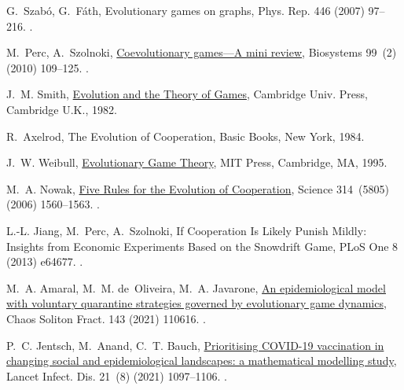 \documentclass[5p,review]{elsarticle}
\begin{document}
\begin{thebibliography}{10}
G.~Szab{\'{o}}, G.~F{\'{a}}th, {Evolutionary games on graphs}, Phys. Rep. 446
  (2007) 97--216.
\newblock \href {http://dx.doi.org/10.1016/j.physrep.2007.04.004}
  {}.

M.~Perc, A.~Szolnoki,
  \href{http://www.sciencedirect.com/science/article/pii/S0303264709001646}{{Coevolutionary
  games—A mini review}}, Biosystems 99~(2) (2010) 109--125.
\newblock \href {http://dx.doi.org/10.1016/j.biosystems.2009.10.003}
  {}.

J.~M. Smith,
  \href{https://books.google.com.br/books?id=Nag2IhmPS3gC{\&}printsec=frontcover{\&}dq=isbn:9780521288842{\&}hl=pt-BR{\&}sa=X{\&}ved=0ahUKEwjw6eHkvePRAhVEiZAKHYOfAcYQ6AEIHDAA{\#}v=onepage{\&}q{\&}f=false}{{Evolution and the Theory of Games}}, Cambridge Univ. Press, Cambridge U.K., 1982.


R.~Axelrod, The Evolution of Cooperation, Basic Books, New York, 1984.

J.~W. Weibull,
  \href{https://mitpress.mit.edu/books/evolutionary-game-theory}{{Evolutionary
  Game Theory}}, MIT Press, Cambridge, MA, 1995.

M.~A. Nowak,
  \href{http://www.sciencemag.org/cgi/doi/10.1126/science.1133755}{{Five Rules
  for the Evolution of Cooperation}}, Science 314~(5805) (2006) 1560--1563.
\newblock \href {http://dx.doi.org/10.1126/science.1133755}
  {}.

L.-L. Jiang, M.~Perc, A.~Szolnoki, {If Cooperation Is Likely Punish Mildly:
  Insights from Economic Experiments Based on the Snowdrift Game}, PLoS One 8
  (2013) e64677.
\newblock \href {https://doi.org/10.1371/journal.pone.0064677}
  {}.


M.~A. Amaral, M.~M. de~Oliveira, M.~A. Javarone,
  \href{https://doi.org/10.1016/j.chaos.2020.110616}{{An
  epidemiological model with voluntary quarantine strategies governed by
  evolutionary game dynamics}}, Chaos Soliton Fract. 143 (2021) 110616.
\newblock  \href {http://dx.doi.org/10.1016/j.chaos.2020.110616}
  {}.


P.~C. Jentsch, M.~Anand, C.~T. Bauch,
  \href{https://linkinghub.elsevier.com/retrieve/pii/S1473309921000578}{{Prioritising
  COVID-19 vaccination in changing social and epidemiological landscapes: a
  mathematical modelling study}}, Lancet Infect. Dis. 21~(8) (2021) 1097--1106.
\newblock \href{http://dx.doi.org/10.1016/S1473-3099(21)00057-8}
  {}.



\end{thebibliography}
\end{document}
